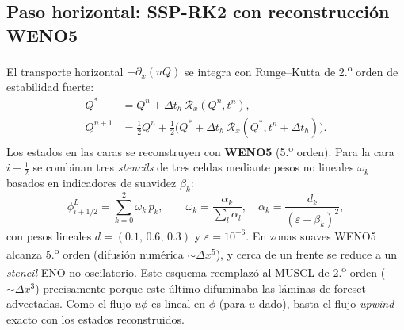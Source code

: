\documentclass[11pt,a4paper]{article}
\begin{document}
\subsection{Paso horizontal: SSP-RK2 con reconstrucción WENO5}
El transporte horizontal $-\partial_x(uQ)$ se integra con Runge--Kutta de
2.\textsuperscript{o} orden de estabilidad fuerte:
\begin{align}
    Q^\ast &= Q^n + \Delta t_h\,\mathcal{R}_x(Q^n,t^n),\\
    Q^{n+1} &= \tfrac12 Q^n + \tfrac12\Big(Q^\ast + \Delta t_h\,\mathcal{R}_x(Q^\ast,t^n{+}\Delta t_h)\Big).
\end{align}
Los estados en las caras se reconstruyen con \textbf{WENO5}
(5.\textsuperscript{o} orden). Para la cara $i+\tfrac12$ se combinan tres
\emph{stencils} de tres celdas mediante pesos no lineales $\omega_k$
basados en indicadores de suavidez $\beta_k$:
\begin{equation}
    \phi^{L}_{i+1/2} = \sum_{k=0}^{2}\omega_k\,p_k,
    \qquad
    \omega_k = \frac{\alpha_k}{\sum_l \alpha_l},
    \quad
    \alpha_k = \frac{d_k}{(\varepsilon+\beta_k)^2},
\end{equation}
con pesos lineales $d=(0.1,\,0.6,\,0.3)$ y $\varepsilon=10^{-6}$. En zonas
suaves WENO5 alcanza 5.\textsuperscript{o} orden (difusión numérica
$\sim\Delta x^5$), y cerca de un frente se reduce a un \emph{stencil} ENO
no oscilatorio. Este esquema reemplazó al MUSCL de 2.\textsuperscript{o}
orden ($\sim\Delta x^3$) precisamente porque este último difuminaba las
láminas de foreset advectadas. Como el flujo $u\phi$ es lineal en $\phi$
(para $u$ dado), basta el flujo \emph{upwind} exacto con los estados
reconstruidos.
\end{document}
